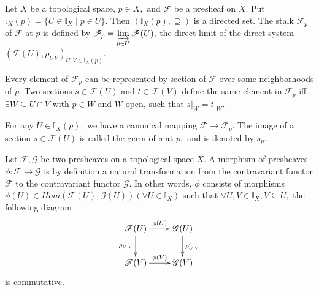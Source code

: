 \begin{Def}
Let $X$ be a topological space, $p\in X,$ and $\mathscr{F}$ be a
presheaf on $X.$ Put $\mathds{I}_X(p)=\{U\in \mathds{I}_X\mid p\in
U\}.$ Then $(\mathds{I}_X(p),\supseteq)$ is a directed set. The
stalk $\mathscr{F}_p$ of $\mathscr{F}$ at $p$ is defined by
$\mathscr{F}_p=\varinjlim\limits_{p\in U}\mathscr{F}(U),$ the direct
limit of the direct system $(\mathscr{F}(U),\rho_{U\,V})_{U,V\in
\mathds{I}_X(p)}.$
\end{Def}
\begin{remark}
Every element of $\mathscr{F}_p$ can be represented by section of
$\mathscr{F}$ over some neighborhoods of $p.$ Two sections $s\in
\mathscr{F}(U)$ and $t\in \mathscr{F}(V)$ define the same element in
$\mathscr{F}_p$ iff $\exists W\subseteq U\cap V$ with $p\in W$ and
$W$ open, such that $\left.s\right|_W = \left.t\right|_W.$

For any $U\in \mathds{I}_X(p),$ we have a canonical mapping
$\mathscr{F}\rightarrow \mathscr{F}_p.$ The image of a section $s\in
\mathscr{F}(U)$ is called the germ of $s$ at $p,$ and is denoted by
$s_p.$
\end{remark}
\begin{Def}
Let $\mathscr{F},\mathscr{G}$ be two presheaves on a topological
space $X.$ A morphism of presheaves $\phi: \mathscr{F}\rightarrow
\mathscr{G}$ is by definition a natural transformation from the
contravariant functor $\mathscr{F}$ to the contravariant functor
$\mathscr{G}.$ In other words, $\phi$ consists of morphisms
$\phi(U)\in Hom(\mathscr{F}(U),\mathscr{G}(U))(\forall U\in
\mathds{I}_X)$ such that $\forall U,V\in \mathds{I}_X,V\subseteq U,$
the following diagram
\[ \xymatrix{
   \mathscr{F}(U) \ar[d]_{\rho_{U\,V}} \ar[r]^-{\phi(U)} &
   \mathscr{G}(U) \ar[d]^{\rho_{U\,V}^{\prime}}         \\
   \mathscr{F}(V) \ar[r]^-{\phi(V)} & \mathscr{G}(V) }  \]
is commutative.
\end{Def}
